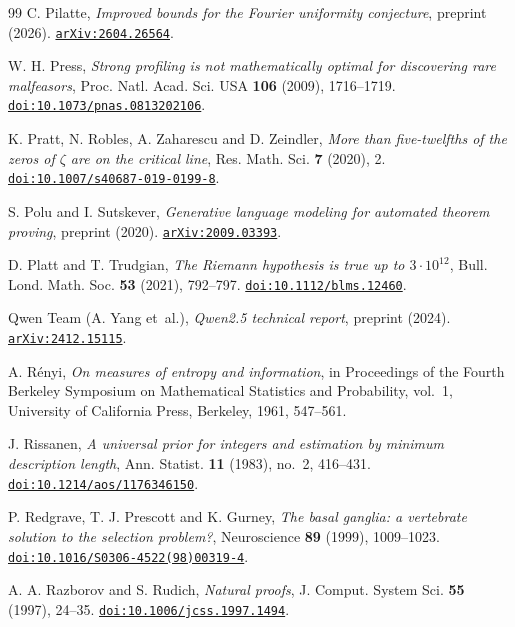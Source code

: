 \begin{thebibliography}{99}
C. Pilatte,
\emph{Improved bounds for the Fourier uniformity conjecture},
preprint (2026).
\href{https://arxiv.org/abs/2604.26564}{\nolinkurl{arXiv:2604.26564}}.

W. H. Press,
\emph{Strong profiling is not mathematically optimal for discovering rare malfeasors},
Proc. Natl. Acad. Sci. USA \textbf{106} (2009), 1716--1719.
\href{https://doi.org/10.1073/pnas.0813202106}{\nolinkurl{doi:10.1073/pnas.0813202106}}.

K. Pratt, N. Robles, A. Zaharescu and D. Zeindler,
\emph{More than five-twelfths of the zeros of $\zeta$ are on the critical line},
Res. Math. Sci. \textbf{7} (2020), 2.
\href{https://doi.org/10.1007/s40687-019-0199-8}{\nolinkurl{doi:10.1007/s40687-019-0199-8}}.

S. Polu and I. Sutskever,
\emph{Generative language modeling for automated theorem proving},
preprint (2020).
\href{https://arxiv.org/abs/2009.03393}{\nolinkurl{arXiv:2009.03393}}.

D. Platt and T. Trudgian,
\emph{The Riemann hypothesis is true up to $3\cdot10^{12}$},
Bull. Lond. Math. Soc. \textbf{53} (2021), 792--797.
\href{https://doi.org/10.1112/blms.12460}{\nolinkurl{doi:10.1112/blms.12460}}.

Qwen Team (A. Yang et~al.),
\emph{Qwen2.5 technical report},
preprint (2024).
\href{https://arxiv.org/abs/2412.15115}{\nolinkurl{arXiv:2412.15115}}.

A. R\'enyi,
\emph{On measures of entropy and information},
in Proceedings of the Fourth Berkeley Symposium on Mathematical Statistics and Probability, vol.~1, University of California Press, Berkeley, 1961, 547--561.

J. Rissanen,
\emph{A universal prior for integers and estimation by minimum description length},
Ann. Statist. \textbf{11} (1983), no.~2, 416--431.
\href{https://doi.org/10.1214/aos/1176346150}{\nolinkurl{doi:10.1214/aos/1176346150}}.

P. Redgrave, T. J. Prescott and K. Gurney,
\emph{The basal ganglia: a vertebrate solution to the selection problem?},
Neuroscience \textbf{89} (1999), 1009--1023.
\href{https://doi.org/10.1016/S0306-4522(98)00319-4}{\nolinkurl{doi:10.1016/S0306-4522(98)00319-4}}.

A. A. Razborov and S. Rudich,
\emph{Natural proofs},
J. Comput. System Sci. \textbf{55} (1997), 24--35.
\href{https://doi.org/10.1006/jcss.1997.1494}{\nolinkurl{doi:10.1006/jcss.1997.1494}}.


\end{thebibliography}
